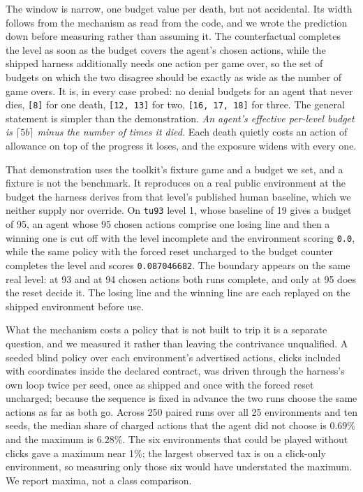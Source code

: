 \documentclass[11pt]{article}
\newcommand{\code}[1]{\texttt{#1}}
\begin{document}
The window is narrow, one budget value per death, but not accidental. Its width follows from the
mechanism as read from the code, and we wrote the prediction down before
measuring rather than assuming it. The counterfactual completes the level as soon as the budget covers the agent's
chosen actions, while the shipped harness additionally needs one action per game
over, so the set of budgets on which the two disagree should be exactly as wide
as the number of game overs. It is, in every case probed: no denial budgets for
an agent that never dies, \code{[8]} for one death, \code{[12, 13]} for two,
\code{[16, 17, 18]} for three. The general statement is simpler than the
demonstration. \emph{An agent's effective per-level budget is $\lceil 5b \rceil$
minus the number of times it died.} Each death quietly costs an action of
allowance on top of the progress it loses, and the exposure widens with every
one.

That demonstration uses the toolkit's fixture game and a budget we set, and a
fixture is not the benchmark. It reproduces on a real public environment at the
budget the harness derives from that level's published human baseline, which we
neither supply nor override. On \code{tu93} level 1, whose baseline of 19 gives
a budget of 95, an agent whose 95 chosen actions comprise one losing line and then a winning
one is cut off with the level incomplete and the environment scoring \code{0.0},
while the same policy with the forced reset uncharged to the budget counter
completes the level and scores \code{0.087046682}. The boundary appears on the same real level: at 93
and at 94 chosen actions both runs complete, and only at 95 does the reset
decide it. The losing line and the winning line are each replayed on the shipped
environment before use.

What the mechanism costs a policy that is not built to trip it is a separate
question, and we measured it rather than leaving the contrivance unqualified. A
seeded blind policy over each environment's advertised actions, clicks included
with coordinates inside the declared contract, was driven through the harness's
own loop twice per seed, once as shipped and once with the forced reset
uncharged; because the sequence is fixed in advance the two runs choose the same
actions as far as both go. Across 250 paired runs over all 25 environments and
ten seeds, the median share of charged actions that the agent did not choose is
$0.69\%$ and the maximum is $6.28\%$. The six environments that could be played
without clicks gave a maximum near 1\%; the largest observed tax is on a
click-only environment, so measuring only those six would have understated the
maximum. We report maxima, not a class comparison.
\end{document}
